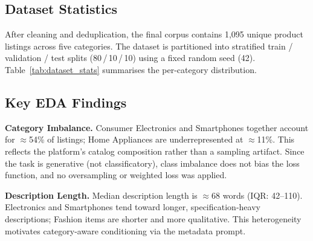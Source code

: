 \documentclass[12pt,a4paper]{article}
\begin{document}
\subsection{Dataset Statistics}

After cleaning and deduplication, the final corpus contains 1,095 unique product
listings across five categories. The dataset is partitioned into stratified train /
validation / test splits (80\,/\,10\,/\,10) using a fixed random seed (42).
Table~\ref{tab:dataset_stats} summarises the per-category distribution.

\begin{table}[H]
\centering
\caption{DPD dataset statistics after cleaning and deduplication.}
\label{tab:dataset_stats}
\end{table}

\subsection{Key EDA Findings}

\textbf{Category Imbalance.} Consumer Electronics and Smartphones together account for
$\approx$54\% of listings; Home Appliances are underrepresented at $\approx$11\%.
This reflects the platform's catalog composition rather than a sampling artifact.
Since the task is generative (not classificatory), class imbalance does not bias the
loss function, and no oversampling or weighted loss was applied.

\textbf{Description Length.} Median description length is $\approx$68 words (IQR: 42--110).
Electronics and Smartphones tend toward longer, specification-heavy descriptions;
Fashion items are shorter and more qualitative. This heterogeneity motivates
category-aware conditioning via the metadata prompt.
\end{document}
